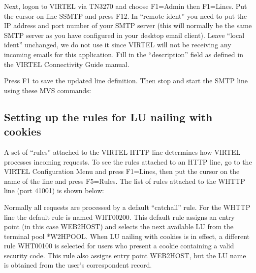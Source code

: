 \documentclass[letterpaper,10pt,english]{sphinxmanual}
\begin{document}
\sphinxAtStartPar
Next, logon to VIRTEL via TN3270 and choose F1=Admin then F1=Lines.  Put the cursor on line S\sphinxhyphen{}SMTP and press F12.  In “remote ident” you need to put the IP address and port number of your SMTP server (this will normally be the same SMTP server as you have configured in your desktop e\sphinxhyphen{}mail client).  Leave “local ident” unchanged, we do not use it since VIRTEL will not be receiving any incoming e\sphinxhyphen{}mails for this application.  Fill in the “description” field as defined in the VIRTEL Connectivity Guide manual.

\sphinxAtStartPar
Press F1 to save the updated line definition. Then stop and start the SMTP line using these MVS commands:

\begin{sphinxVerbatim}[commandchars=\\\{\}]
 
 
\end{sphinxVerbatim}


\subsection{Setting up the rules for LU nailing with cookies}
\label{\detokenize{connectivity_guide:setting-up-the-rules-for-lu-nailing-with-cookies}}
\sphinxAtStartPar
A set of “rules” attached to the VIRTEL HTTP line determines how VIRTEL processes incoming requests.  To see the rules attached to an HTTP line, go to the VIRTEL Configuration Menu and press F1=Lines, then put the cursor on the name of the line and press F5=Rules.  The list of rules attached to the W\sphinxhyphen{}HTTP line (port 41001) is shown below:

\sphinxAtStartPar
{}

\sphinxAtStartPar
{}

\sphinxAtStartPar
Normally all requests are processed by a default “catch\sphinxhyphen{}all” rule.  For the W\sphinxhyphen{}HTTP line the default rule is named WHT00200.  This default rule assigns an entry point (in this case WEB2HOST) and selects the next available LU from the terminal pool *W2HPOOL.  When LU nailing with cookies is in effect, a different rule WHT00100 is selected for users who present a cookie containing a valid security code.  This rule also assigns entry point WEB2HOST, but the LU name is obtained from the user’s correspondent record.
\end{document}
